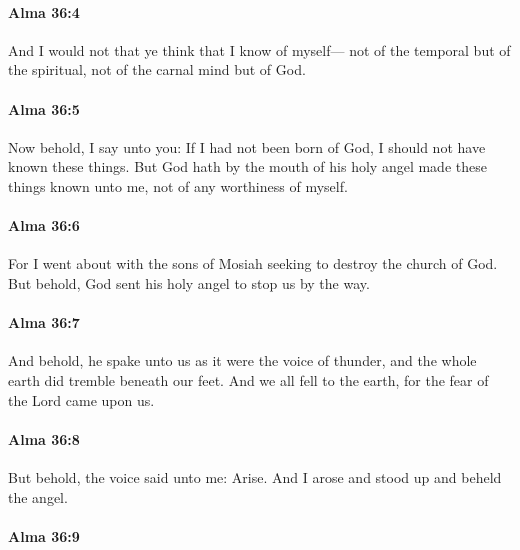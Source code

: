 		\paragraph{Alma 36:4} %
			\label{ALMA-36-4}

			And I would not that ye think that I know of myself---
			not of the temporal but of the spiritual,
			not of the carnal mind but of God.

		\paragraph{Alma 36:5} %
			\label{ALMA-36-5}

			Now behold, I say unto you:
			If I had not been born of God, I should not have known these things.
			But God hath by the mouth of his holy angel made these things known unto me,
			not of any worthiness of myself.

		\paragraph{Alma 36:6} %
			\label{ALMA-36-6}

			For I went about with the sons of Mosiah seeking to destroy the church of God.
			But behold, God sent his holy angel to stop us by the way.

		\paragraph{Alma 36:7} %
			\label{ALMA-36-7}

			And behold, he spake unto us as it were the voice of thunder,
			and the whole earth did tremble beneath our feet.
			And we all fell to the earth,
			for the fear of the Lord came upon us.

		\paragraph{Alma 36:8} %
			\label{ALMA-36-8}

			But behold, the voice said unto me: Arise.
			And I arose and stood up and beheld the angel.

		\paragraph{Alma 36:9} %
			\label{ALMA-36-9}


